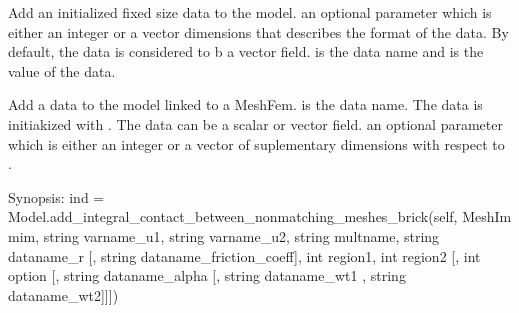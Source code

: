 \documentclass[a4paper,11pt,english]{sphinxmanual}
\begin{document}
\begin{fulllineitems}

\begin{fulllineitems}
\label{\detokenize{python/cmdref_Model:getfem.Model.add_initialized_data}}
Add an initialized fixed size data to the model.  an
optional parameter which is either an 
integer  or a vector dimensions that describes the format of the
data. By default, the data is considered to b a vector field.
 is the data name and  is the value of the data.

\end{fulllineitems}


\begin{fulllineitems}
\label{\detokenize{python/cmdref_Model:getfem.Model.add_initialized_fem_data}}
Add a data to the model linked to a MeshFem.  is the data name.
The data is initiakized with . The data can be a scalar or vector
field.  an optional parameter which is either an 
integer or a vector of suplementary dimensions with respect to .

\end{fulllineitems}


\begin{fulllineitems}
\label{\detokenize{python/cmdref_Model:getfem.Model.add_integral_contact_between_nonmatching_meshes_brick}}
Synopsis: ind = Model.add\_integral\_contact\_between\_nonmatching\_meshes\_brick(self,  MeshIm mim, string varname\_u1, string varname\_u2, string multname, string dataname\_r {[}, string dataname\_friction\_coeff{]}, int region1, int region2 {[}, int option {[}, string dataname\_alpha {[}, string dataname\_wt1 , string dataname\_wt2{]}{]}{]})


\end{fulllineitems}
\end{fulllineitems}
\end{document}
